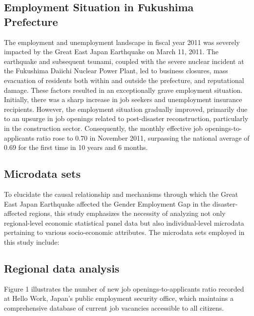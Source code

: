 \documentclass[12pt,halfline,a4paper]{ouparticle}
\begin{document}
\subsection{Employment Situation in Fukushima Prefecture}
\label{sec4.1}

The employment and unemployment landscape in fiscal year 2011 was severely impacted by the Great East Japan Earthquake on March 11, 2011. The earthquake and subsequent tsunami, coupled with the severe nuclear incident at the Fukushima Daiichi Nuclear Power Plant, led to business closures, mass evacuation of residents both within and outside the prefecture, and reputational damage. These factors resulted in an exceptionally grave employment situation. Initially, there was a sharp increase in job seekers and unemployment insurance recipients. However, the employment situation gradually improved, primarily due to an upsurge in job openings related to post-disaster reconstruction, particularly in the construction sector. Consequently, the monthly effective job openings-to-applicants ratio rose to 0.70 in November 2011, surpassing the national average of 0.69 for the first time in 10 years and 6 months.


\subsection{Microdata sets}
\label{sec4.1}

To elucidate the causal relationship and mechanisms through which the Great East Japan Earthquake affected the Gender Employment Gap in the disaster-affected regions, this study emphasizes the necessity of analyzing not only regional-level economic statistical panel data but also individual-level microdata pertaining to various socio-economic attributes. The microdata sets employed in this study include:

\subsection{Regional data analysis}
\label{sec4.1}

Figure 1 illustrates the number of new job openings-to-applicants ratio recorded at Hello Work, Japan’s public employment security office, which maintains a comprehensive database of current job vacancies accessible to all citizens. 
\end{document}
